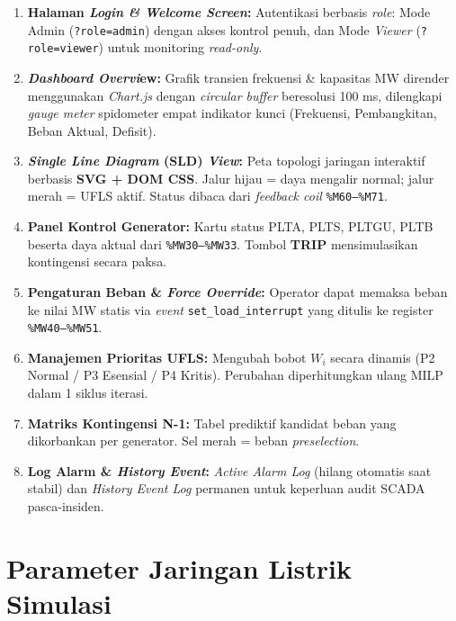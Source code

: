 \begin{enumerate}
\item[a.] \textbf{Halaman \textit{Login \& Welcome Screen}:} Autentikasi berbasis \textit{role}: Mode Admin (\texttt{?role=admin}) dengan akses kontrol penuh, dan Mode \textit{Viewer} (\texttt{?role=viewer}) untuk monitoring \textit{read-only}.

\item[b.] \textbf{\textit{Dashboard Overvi}ew:} Grafik transien frekuensi \& kapasitas MW dirender menggunakan \textit{Chart.js} dengan \textit{circular buffer} beresolusi 100 ms, dilengkapi \textit{gauge meter} spidometer empat indikator kunci (Frekuensi, Pembangkitan, Beban Aktual, Defisit).

\item[c.] \textbf{\textit{Single Line Diagram} (SLD) \textit{View}:} Peta topologi jaringan interaktif berbasis \textbf{SVG + DOM CSS}. Jalur hijau = daya mengalir normal; jalur merah = UFLS aktif. Status dibaca dari \textit{feedback coil} \texttt{\%M60--\%M71}.

\item[d.] \textbf{Panel Kontrol Generator:} Kartu status PLTA, PLTS, PLTGU, PLTB beserta daya aktual dari \texttt{\%MW30--\%MW33}. Tombol \textbf{TRIP} mensimulasikan kontingensi secara paksa.

\item[e.] \textbf{Pengaturan Beban \& \textit{Force Override}:} Operator dapat memaksa beban ke nilai MW statis via \textit{event} \texttt{set\_load\_interrupt} yang ditulis ke register \texttt{\%MW40--\%MW51}.

\item[f.] \textbf{Manajemen Prioritas UFLS:} Mengubah bobot $W_i$ secara dinamis (P2 Normal / P3 Esensial / P4 Kritis). Perubahan diperhitungkan ulang MILP dalam 1 siklus iterasi.

\item[g.] \textbf{Matriks Kontingensi N-1:} Tabel prediktif kandidat beban yang dikorbankan per generator. Sel merah = beban \textit{preselection}.

\item[h.] \textbf{Log Alarm \& \textit{History Event}:} \textit{Active Alarm Log} (hilang otomatis saat stabil) dan \textit{History Event Log} permanen untuk keperluan audit SCADA pasca-insiden.
\end{enumerate}

\section{Parameter Jaringan Listrik Simulasi}
\label{sec:Parameter_Jaringan}

